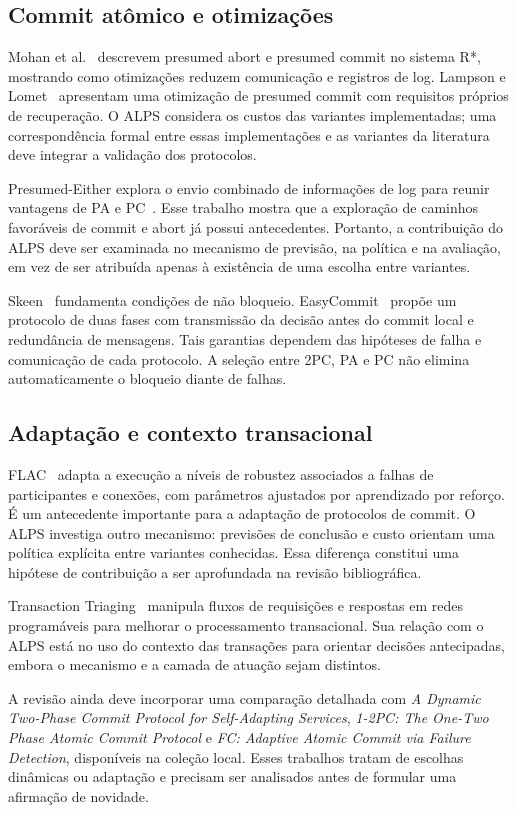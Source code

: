 \documentclass[12pt,a4paper]{article}
\begin{document}
\subsection{Commit atômico e otimizações}
Mohan et al.~\cite{mohan1986} descrevem presumed abort e presumed commit no sistema R*, mostrando como otimizações reduzem comunicação e registros de log. Lampson e Lomet~\cite{lampson1993} apresentam uma otimização de presumed commit com requisitos próprios de recuperação. O ALPS considera os custos das variantes implementadas; uma correspondência formal entre essas implementações e as variantes da literatura deve integrar a validação dos protocolos.

Presumed-Either explora o envio combinado de informações de log para reunir vantagens de PA e PC~\cite{attaluri2002}. Esse trabalho mostra que a exploração de caminhos favoráveis de commit e abort já possui antecedentes. Portanto, a contribuição do ALPS deve ser examinada no mecanismo de previsão, na política e na avaliação, em vez de ser atribuída apenas à existência de uma escolha entre variantes.

Skeen~\cite{skeen1981} fundamenta condições de não bloqueio. EasyCommit~\cite{gupta2018} propõe um protocolo de duas fases com transmissão da decisão antes do commit local e redundância de mensagens. Tais garantias dependem das hipóteses de falha e comunicação de cada protocolo. A seleção entre 2PC, PA e PC não elimina automaticamente o bloqueio diante de falhas.

\subsection{Adaptação e contexto transacional}
FLAC~\cite{pan2023} adapta a execução a níveis de robustez associados a falhas de participantes e conexões, com parâmetros ajustados por aprendizado por reforço. É um antecedente importante para a adaptação de protocolos de commit. O ALPS investiga outro mecanismo: previsões de conclusão e custo orientam uma política explícita entre variantes conhecidas. Essa diferença constitui uma hipótese de contribuição a ser aprofundada na revisão bibliográfica.

Transaction Triaging~\cite{jepsen2021} manipula fluxos de requisições e respostas em redes programáveis para melhorar o processamento transacional. Sua relação com o ALPS está no uso do contexto das transações para orientar decisões antecipadas, embora o mecanismo e a camada de atuação sejam distintos.

A revisão ainda deve incorporar uma comparação detalhada com \textit{A Dynamic Two-Phase Commit Protocol for Self-Adapting Services}, \textit{1-2PC: The One-Two Phase Atomic Commit Protocol} e \textit{FC: Adaptive Atomic Commit via Failure Detection}, disponíveis na coleção local. Esses trabalhos tratam de escolhas dinâmicas ou adaptação e precisam ser analisados antes de formular uma afirmação de novidade.
\end{document}
